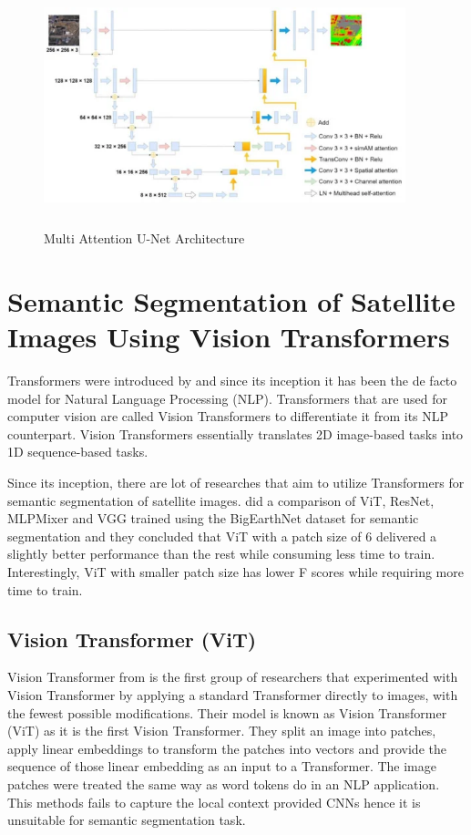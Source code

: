 \begin{figure}[ht]
\includegraphics[width=10.5cm, height=7cm]{images/maunet.png}
\centering
\caption{Multi Attention U-Net Architecture \protect\cite{multi-attention-unet}}
\label{fig:maunet}
\end{figure}

\section{Semantic Segmentation of Satellite Images Using Vision Transformers}

Transformers were introduced by \cite{attention-is-all-you-need} and since its inception it has been the de facto model for Natural Language Processing (NLP). Transformers that are used for computer vision are called Vision Transformers to differentiate it from its NLP counterpart. Vision Transformers essentially translates 2D image-based tasks into 1D sequence-based tasks.

Since its inception, there are lot of researches that aim to utilize Transformers for semantic segmentation of satellite images. 
\cite{benchmarking-scaling} did a comparison of ViT, ResNet, MLPMixer and VGG trained using the BigEarthNet dataset for semantic segmentation and they concluded that ViT with a patch size of 6 delivered a slightly better performance than the rest while consuming less time to train. Interestingly, ViT with smaller patch size has lower F scores while requiring more time to train.

\subsection{Vision Transformer (ViT)}
Vision Transformer from \cite{16x16} is the first group of researchers that experimented with Vision Transformer by applying a standard Transformer directly to images, with the fewest possible modifications. Their model is known as Vision Transformer (ViT) as it is the first Vision Transformer. They split an image into patches, apply linear embeddings to transform the patches into vectors and provide the sequence of those linear embedding as an input to a Transformer. The image patches were treated the same way as word tokens do in an NLP application. This methods fails to capture the local context provided  CNNs hence it is unsuitable for semantic segmentation task.

